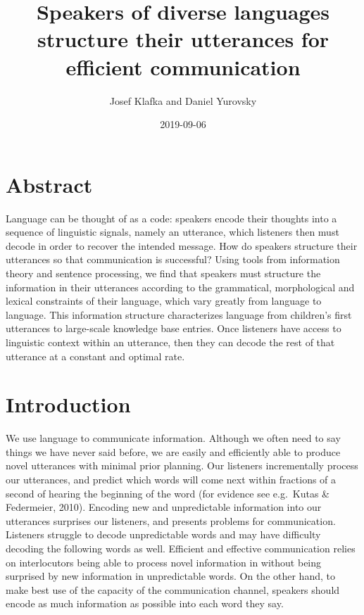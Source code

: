\documentclass[11pt,]{article}
\title{Speakers of diverse languages structure their utterances for efficient communication}
\author{Josef Klafka and Daniel Yurovsky}
\date{2019-09-06}
\begin{document}
\maketitle

\hypertarget{abstract}{%
\section{Abstract}\label{abstract}}

Language can be thought of as a code: speakers encode their thoughts into a sequence of linguistic signals, namely an utterance, which listeners then must decode in order to recover the intended message. How do speakers structure their utterances so that communication is successful? Using tools from information theory and sentence processing, we find that speakers must structure the information in their utterances according to the grammatical, morphological and lexical constraints of their language, which vary greatly from language to language. This information structure characterizes language from children's first utterances to large-scale knowledge base entries. Once listeners have access to linguistic context within an utterance, then they can decode the rest of that utterance at a constant and optimal rate.

\hypertarget{introduction}{%
\section{Introduction}\label{introduction}}

We use language to communicate information. Although we often need to say things we have never said before, we are easily and efficiently able to produce novel utterances with minimal prior planning. Our listeners incrementally process our utterances, and predict which words will come next within fractions of a second of hearing the beginning of the word (for evidence see e.g.~Kutas \& Federmeier, 2010). Encoding new and unpredictable information into our utterances surprises our listeners, and presents problems for communication. Listeners struggle to decode unpredictable words and may have difficulty decoding the following words as well. Efficient and effective communication relies on interlocutors being able to process novel information in without being surprised by new information in unpredictable words. On the other hand, to make best use of the capacity of the communication channel, speakers should encode as much information as possible into each word they say.
\end{document}

